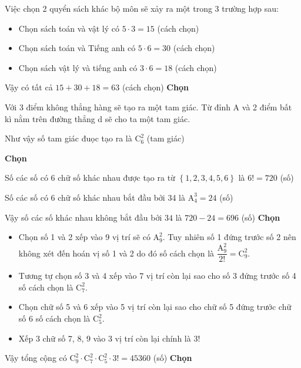 \begin{loigiaiex}{1}
  \par Việc chọn 2 quyển sách khác bộ môn sẽ xảy ra một trong 3 trường hợp sau: \begin {itemize} \item Chọn sách toán và vật lý có $5 \cdot 3 =15$ (cách chọn) \item Chọn sách toán và Tiếng anh có $5 \cdot 6 =30$ (cách chọn) \item Chọn sách vật lý và tiếng anh có $3 \cdot 6 =18$ (cách chọn) \end {itemize} \par Vậy có tất cả $15 + 30 + 18 =63 $ (cách chọn)  \phantom {a}\hfill {\bfseries \sffamily Chọn~} 
\end{loigiaiex}
\begin{loigiaiex}{2}
  \par Với 3 điểm không thẳng hàng sẽ tạo ra một tam giác. Từ đỉnh A và 2 điểm bất kì nằm trên đường thẳng d sẽ cho ta một tam giác. \par Như vậy số tam giác đuọc tạo ra là $\mathrm {C}_6^2$ (tam giác) \par  \phantom {a}\hfill {\bfseries \sffamily Chọn~} 
\end{loigiaiex}
\begin{loigiaiex}{3}
  \par Số các số có 6 chữ số khác nhau được tạo ra từ $\left \{1, 2, 3, 4, 5, 6\right \}$ là $6!=720$ (số) \par Số các số có 6 chữ số khác nhau bắt đầu bởi 34 là $\mathrm {A}_4^3=24$ (số) \par Vậy số các số khác nhau không bắt đầu bởi $34$ là $720-24=696$ (số)  \phantom {a}\hfill {\bfseries \sffamily Chọn~} 
\end{loigiaiex}
\begin{loigiaiex}{4}
  \begin {itemize} \item Chọn số 1 và 2 xếp vào 9 vị trí sẽ có $\mathrm {A}_9^2$. Tuy nhiên số 1 đứng trước số 2 nên không xét đến hoán vị số 1 và 2 do đó số cách chọn là $\dfrac {\mathrm {A}_9^2}{2!}= \mathrm {C}_9^2 $. \item Tương tự chọn số 3 và 4 xếp vào 7 vị trí còn lại sao cho số 3 đứng trước số 4 số cách chọn là $\mathrm {C}_7^2 $. \item Chọn chữ số 5 và 6 xếp vào 5 vị trí còn lại sao cho chữ số 5 đứng trước chữ số 6 số cách chọn là $\mathrm {C}_5^2 $. \item Xếp 3 chữ số 7, 8, 9 vào 3 vị trí còn lại chính là $3!$ \end {itemize} Vậy tổng cộng có $\mathrm {C}_9^2\cdot \mathrm {C}_7^2\cdot \mathrm {C}_5^2\cdot 3!=45360 $ (số)  \phantom {a}\hfill {\bfseries \sffamily Chọn~} 
\end{loigiaiex}
